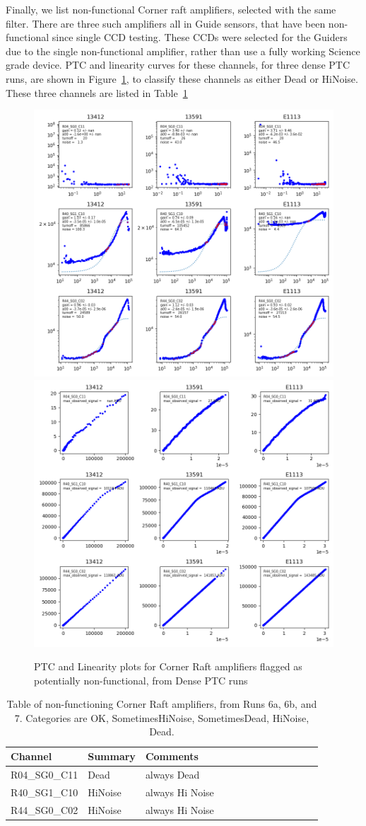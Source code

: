 Finally, we list non-functional Corner raft amplifiers, selected with the same filter.  There are three such amplifiers all in Guide sensors, that have been non-functional since single CCD testing.  These CCDs were selected for the Guiders due to the single non-functional amplifier, rather than use a fully working Science grade device. PTC and linearity curves for these channels, for three dense PTC runs, are shown in Figure~\ref{fig:ptclin-badamps-corner}, to classify these channels as either Dead or HiNoise. These three channels are listed in Table~\ref{tab:badamps-corner}

\begin{figure}[ht]
    \centering
    \includegraphics[width=0.45\linewidth]{figures/ptc_badamps_corner.png}
    \includegraphics[width=0.45\linewidth]{figures/lin_badamps_corner.png}
    \caption{PTC and Linearity plots for Corner Raft amplifiers flagged as potentially non-functional, from Dense PTC runs}
    \label{fig:ptclin-badamps-corner}
\end{figure}

\begin{table}[!ht]
    \tiny
    \centering
    \begin{tabular}{|l|l|l|l|l|l|l|l|l|l|l|l|l|}
    \hline
        Channel & Summary & Comments  \\ \hline

R04\_SG0\_C11  & Dead & always Dead \\ \hline
R40\_SG1\_C10  & HiNoise & always Hi Noise \\ \hline
R44\_SG0\_C02  & HiNoise & always Hi Noise\\ \hline

    \end{tabular}
    \caption{Table of non-functioning Corner Raft amplifiers, from Runs 6a, 6b, and 7. Categories are OK, SometimesHiNoise, SometimesDead, HiNoise, Dead. \label{tab:badamps-corner}}
\end{table}


